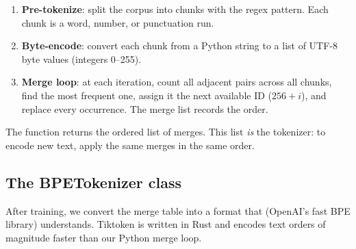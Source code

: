 \begin{enumerate}
  \item \textbf{Pre-tokenize}: split the corpus into chunks with the regex pattern.  Each chunk is a word, number, or punctuation run.
  \item \textbf{Byte-encode}: convert each chunk from a Python string to a list of UTF-8 byte values (integers 0--255).
  \item \textbf{Merge loop}: at each iteration, count all adjacent pairs across all chunks, find the most frequent one, assign it the next available ID ($256 + i$), and replace every occurrence.  The merge list records the order.
\end{enumerate}

The function returns the ordered list of merges.  This list \emph{is} the tokenizer: to encode new text, apply the same merges in the same order.



\subsection{The BPETokenizer class}

After training, we convert the merge table into a format that  (OpenAI's fast BPE library) understands.  Tiktoken is written in Rust and encodes text orders of magnitude faster than our Python merge loop.

